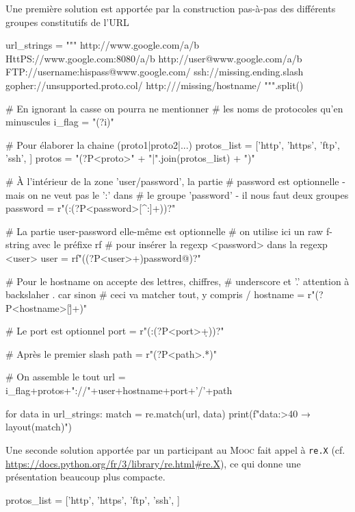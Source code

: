 \begin{solution}
Une première solution est apportée par la construction pas-à-pas des différents groupes constitutifs de l'URL

\begin{idleconsole}
	\begin{pyconsole}
url_strings = """
http://www.google.com/a/b
HttPS://www.google.com:8080/a/b
http://user@www.google.com/a/b
FTP://username:hispass@www.google.com/
ssh://missing.ending.slash
gopher://unsupported.proto.col/
http:///missing/hostname/
""".split()

# En ignorant la casse on pourra ne mentionner 
# les noms de protocoles qu'en minuscules
i_flag = "(?i)"

# Pour élaborer la chaine (proto1|proto2|...)
protos_list = ['http', 'https', 'ftp', 'ssh', ]
protos = "(?P<proto>" + "|".join(protos_list) + ")"

# À l'intérieur de la zone 'user/password', la partie
# password est optionnelle - mais on ne veut pas le ':' dans
# le groupe 'password' - il nous faut deux groupes
password = r"(:(?P<password>[^:]+))?"

# La partie user-password elle-même est optionnelle
# on utilise ici un raw f-string avec le préfixe rf
# pour insérer la regexp <password> dans la regexp <user>
user = rf"((?P<user>\w+){password}@)?"

# Pour le hostname on accepte des lettres, chiffres, 
# underscore et '.' attention à backslaher . car sinon 
# ceci va matcher tout, y compris /
hostname = r"(?P<hostname>[\w\.]+)"

# Le port est optionnel
port = r"(:(?P<port>\d+))?"

# Après le premier slash
path = r"(?P<path>.*)"

# On assemble le tout
url = i_flag+protos+"://"+user+hostname+port+'/'+path

for data in url_strings:
    match = re.match(url, data)
    print(f"{data:>40} → {layout(match)}")

	\end{pyconsole}
\end{idleconsole}

Une seconde solution apportée par un participant au \textsc{Mooc} fait appel à \texttt{re.X} (cf. \url{https://docs.python.org/fr/3/library/re.html\#re.X}), ce qui donne une présentation beaucoup plus compacte.

\begin{idleconsole}
	\begin{pyconsole}
protos_list = ['http', 'https', 'ftp', 'ssh', ]


\end{pyconsole}
\end{idleconsole}
\end{solution}
